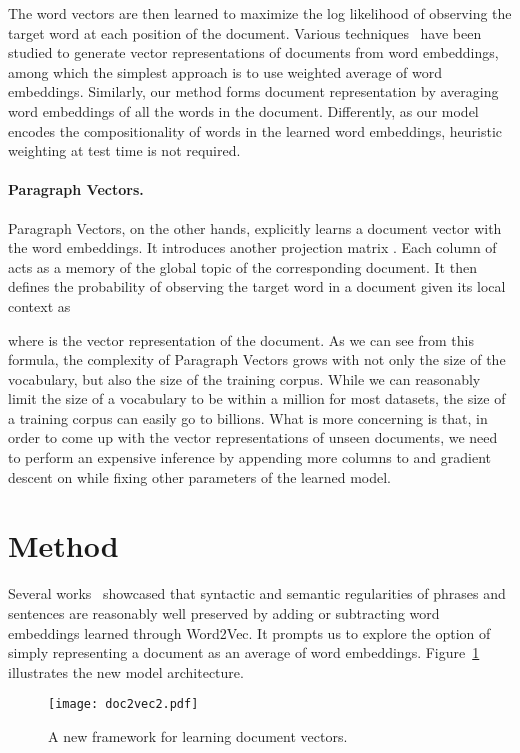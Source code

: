 \documentclass{article} \usepackage{iclr2017_conference,times}
\begin{document}
The word vectors are then learned to maximize the log likelihood of observing the target word at each position of the document. Various techniques~\citep{mitchell2010composition, zanzotto2010estimating, yessenalina2011compositional, grefenstette2013multi, socher2013recursive,kusner2015word}  have been studied to generate vector representations of documents from word embeddings, among which the simplest approach is to use weighted average of word embeddings. Similarly, our method forms document representation by averaging word embeddings of all the words in the document. Differently, as our model encodes the compositionality of words in the learned word embeddings, heuristic weighting at test time is not required.


\paragraph{Paragraph Vectors.}
\label{sec:doc2vec}
Paragraph Vectors, on the other hands, explicitly learns a document vector with the word embeddings. It introduces another projection matrix . Each column of  acts as a memory of the global topic of the corresponding document. It then defines the probability of observing the target word  in a document  given its local context  as

where  is the vector representation of the document.  As we can see from this formula, the complexity of Paragraph Vectors grows with not only the size of the vocabulary, but also the size of the training corpus. While we can reasonably limit the size of a vocabulary to be within a million for most datasets, the size of a training corpus can easily go to billions. What is more concerning is that, in order to come up with the vector representations of unseen documents, we need to perform an expensive inference by appending more columns to  and gradient descent on  while fixing other parameters of the learned model. 


\section{Method}
\label{method}



Several works~\citep{mikolov2013distributed,mikolov2013linguistic} showcased that syntactic and semantic regularities of phrases and sentences are reasonably well preserved by adding or subtracting word embeddings learned through Word2Vec. It prompts us to explore the option of simply representing a document as an average of word embeddings. Figure~\ref{fig:architecture} illustrates the new model architecture.  
\begin{figure}[h]
\vspace{-0.1in}
\centering
  \texttt{[image: doc2vec2.pdf]}
  \vspace{-0.1in}
  \caption{A new framework for learning document vectors.}
  \label{fig:architecture}
  \vspace{-0.1in}
\end{figure} 
\end{document}
